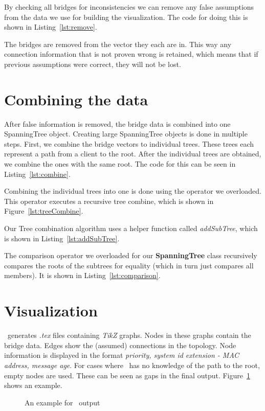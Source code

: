 By checking all bridges for inconsistencies we can remove any false assumptions from the data we use for building the visualization.
The code for doing this is shown in Listing~\ref{lst:remove}.

The bridges are removed from the vector they each are in.
This way any connection information that is not proven wrong is retained, which means that if previous assumptions were correct, they will not be lost.

\section{Combining the data}
\label{combining_data}
After false information is removed, the bridge data is combined into one SpanningTree object.
Creating large SpanningTree objects is done in multiple steps.
First, we combine the bridge vectors to individual trees.
These trees each represent a path from a client to the root.
After the individual trees are obtained, we combine the ones with the same root.
The code for this can be seen in Listing~\ref{lst:combine}.


Combining the individual trees into one is done using the operator we overloaded.
This operator executes a recursive tree combine, which is shown in Figure~\ref{lst:treeCombine}.


Our Tree combination algorithm uses a helper function called \textit{addSubTree}, which is shown in Listing~\ref{lst:addSubTree}.


The comparison operator we overloaded for our \textbf{SpanningTree} class recursively compares the roots of the subtrees for equality (which in turn just compares all members).
It is shown in Listing~\ref{lst:comparison}.


\section{Visualization}
\tool\ generates \textit{.tex} files containing \textit{TikZ} graphs.
Nodes in these graphs contain the bridge data.
Edges show the (assumed) connections in the topology.
Node information is displayed in the format \textit{priority, system id extension - MAC address, message age}.
For cases where \tool\ has no knowledge of the path to the root, empty nodes are used.
These can be seen as gaps in the final output.
Figure~\ref{fig:viz_example} shows an example.
\begin{figure}[h]
    \centering
    
    \caption{An example for \tool\ output}
    \label{fig:viz_example}
\end{figure}

